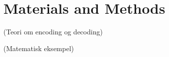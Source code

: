 \documentclass[Main]{subfiles}
\begin{document}
\section*{Materials and Methods}

(Teori om encoding og decoding)

(Matematisk eksempel)
\end{document}

